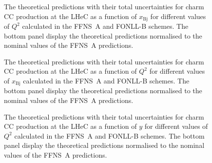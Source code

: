 \documentclass[pdftex,twocolumn,epjc3]{svjour3}          %
\newcommand{\xbj}{\ensuremath{x_{\text{Bj}}}\xspace}
\newcommand{\fonll} {{FONLL-B}\xspace}
\newcommand{\ffns} {{FFNS~A}\xspace}
\begin{document}
\begin{figure}
    \centering
    \caption{The theoretical predictions with their total uncertainties for charm CC production at the LHeC as a function of \xbj for different values of $Q^2$ calculated in the \ffns and \fonll schemes. The bottom panel display the theoretical predictions normalised to the nominal values of the \ffns predictions.}
    \label{fig:thpred-x}
\end{figure}

\begin{figure}
    \centering
    \caption{The theoretical predictions with their total uncertainties for charm CC production at the LHeC as a function of $Q^2$ for different values of \xbj calculated in the \ffns and \fonll schemes. The bottom panel display the theoretical predictions normalised to the nominal values of the \ffns predictions.}
    \label{fig:thpred-q2}
\end{figure}

\begin{figure}
    \centering
    \caption{The theoretical predictions with their total uncertainties for charm CC production at the LHeC as a function of $y$ for different values of $Q^2$ calculated in the \ffns and \fonll schemes. The bottom panel display the theoretical predictions normalised to the nominal values of the \ffns predictions.}
    \label{fig:thpred-y}
\end{figure}
\end{document}
